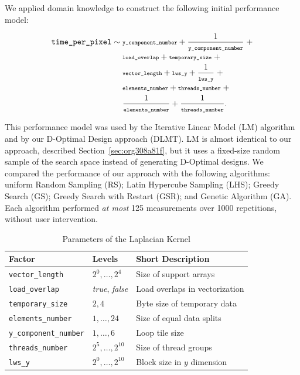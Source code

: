 \documentclass[conference]{IEEEtran}
\begin{document}
We applied domain knowledge to construct the following initial performance model:
\vspace{-2pt}
\\\begin{minipage}{\linewidth}\scriptsize
\begin{align}
\label{eq:gpu_laplacian_performance_model}
\texttt{time\_per\_pixel} \sim & \scriptsize\; \texttt{y\_component\_number} + \frac{1}{\texttt{y\_component\_number}} \; + \nonumber \\
& \scriptsize\; \texttt{load\_overlap} + \texttt{temporary\_size} \; + \nonumber \\
& \scriptsize\; \texttt{vector\_length} + \texttt{lws\_y} + \frac{1}{\texttt{lws\_y}} \; + \\
& \scriptsize\; \texttt{elements\_number} + \texttt{threads\_number}  \; + \nonumber \\
& \scriptsize\; \frac{1}{\texttt{elements\_number}} + \frac{1}{\texttt{threads\_number}}\text{.} \nonumber
\end{align}
\vspace{2pt}
\end{minipage}
This performance model was used by the Iterative Linear Model (LM) algorithm and
by our D-Optimal Design approach (DLMT). LM is almost identical to our approach,
described  Section~\ref{sec:org308a81f},  but  it  uses  a
fixed-size random  sample of  the search space  instead of  generating D-Optimal
designs.  We  compared  the  performance  of our  approach  with  the  following
algorithms: uniform Random Sampling (RS); Latin Hypercube Sampling (LHS); Greedy
Search (GS); Greedy Search with Restart  (GSR); and Genetic Algorithm (GA). Each
algorithm performed \emph{at most} 125 measurements over 1000 repetitions, without user
intervention.

\begin{table}[t]
\caption{\label{tab:org342eaa1}
Parameters of the Laplacian Kernel}
\centering
\scriptsize
\begin{tabular}{llp{}}
\toprule
Factor & Levels & Short Description\\
\midrule
\texttt{vector\_length} & \(2^0,\dots,2^4\) & Size of support arrays\\
\texttt{load\_overlap} & \textit{true}, \textit{false} & Load overlaps in vectorization\\
\texttt{temporary\_size} & \(2,4\) & Byte size of temporary data\\
\texttt{elements\_number} & \(1,\dots,24\) & Size of equal data splits\\
\texttt{y\_component\_number} & \(1,\dots,6\) & Loop tile size\\
\texttt{threads\_number} & \(2^5,\dots,2^{10}\) & Size of thread groups\\
\texttt{lws\_y} & \(2^0,\dots,2^{10}\) & Block size in \(y\) dimension\\
\bottomrule
\end{tabular}
\end{table}
\end{document}

